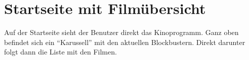\section{Startseite mit Filmübersicht}
\authorsection{\authorNL}

Auf der Startseite sieht der Benutzer direkt das Kinoprogramm.
Ganz oben befindet sich ein \enquote{Karussell} mit den aktuellen Blockbustern.
Direkt darunter folgt dann die Liste mit den Filmen.

\begin{figure}[ht]
	\centering
	\hfill

\end{figure}
